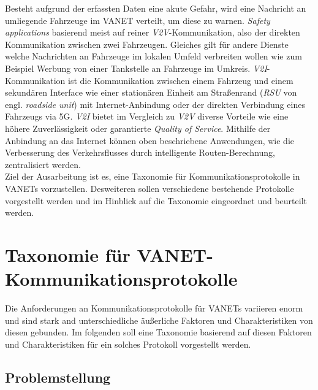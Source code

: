 \documentclass[english,runningheads,a4paper]{llncs}[2018/03/10]
\begin{document}
Besteht aufgrund der erfassten Daten eine akute Gefahr, wird eine Nachricht an umliegende Fahrzeuge im VANET verteilt, um diese zu warnen.
\textit{Safety applications} basierend meist auf reiner \textit{V2V}-Kommunikation, also der direkten Kommunikation zwischen zwei Fahrzeugen.
Gleiches gilt für andere Dienste welche Nachrichten an Fahrzeuge im lokalen Umfeld verbreiten wollen wie zum Beispiel Werbung von einer Tankstelle an Fahrzeuge im Umkreis.
\textit{V2I}-Kommunikation ist die Kommunikation zwischen einem Fahrzeug und einem sekundären Interface wie einer stationären Einheit am Straßenrand (\textit{RSU} von engl. \textit{roadside unit}) mit Internet-Anbindung oder der direkten Verbindung eines Fahrzeugs via 5G\@.
\textit{V2I} bietet im Vergleich zu \textit{V2V} diverse Vorteile wie eine höhere Zuverlässigkeit oder garantierte \textit{Quality of Service}.
Mithilfe der Anbindung an das Internet können oben beschriebene Anwendungen, wie die Verbesserung des Verkehrsflusses durch intelligente Routen-Berechnung, zentralisiert werden.\\
Ziel der Ausarbeitung ist es, eine Taxonomie für Kommunikationsprotokolle in VANETs vorzustellen.
Desweiteren sollen verschiedene bestehende Protokolle vorgestellt werden und im Hinblick auf die Taxonomie eingeordnet und beurteilt werden.


\section{Taxonomie für VANET-Kommunikationsprotokolle}
\label{sec:taxcommunicationprotocol}
Die Anforderungen an Kommunikationsprotokolle für VANETs variieren enorm und sind stark and unterschiedliche äußerliche Faktoren und Charakteristiken von diesen gebunden.
Im folgenden soll eine Taxonomie basierend auf diesen Faktoren und Charakteristiken für ein solches Protokoll vorgestellt werden.

\subsection{Problemstellung}
\end{document}
